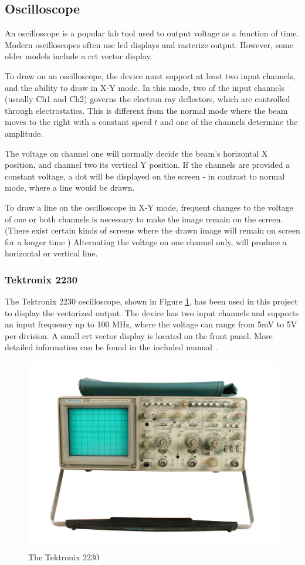 \subsection{Oscilloscope}
An oscilloscope is a popular lab tool used to output voltage as a function of time.
Modern oscilloscopes often use \gls{lcd} displays and rasterize output.
However, some older models include a \gls{crt} vector display.

To draw on an oscilloscope, the device must support at least two input channels, and the ability to draw in X-Y mode.
In this mode, two of the input channels (usually Ch1 and Ch2) governs the electron ray deflectors, which are controlled through electrostatics.
This is different from the normal mode where the beam moves to the right with a constant speed \( t \) and one of the channels determine the amplitude.

The voltage on channel one will normally decide the beam's horizontal X position, and channel two its vertical Y position.
If the channels are provided a constant voltage, a dot will be displayed on the screen - in contrast to normal mode, where a line would be drawn.

To draw a line on the oscilloscope in X-Y mode, frequent changes to the voltage of one or both channels is necessary to make the image remain on the screen.
(There exist certain kinds of screens where the drawn image will remain on screen for a longer time \cite{tektronix4010})
Alternating the voltage on one channel only, will produce a horizontal or vertical line.

\subsubsection{Tektronix 2230}
The Tektronix 2230 oscilloscope, shown in Figure \ref{fig:oscilloscope}, has been used in this project to display the vectorized output.
The device has two input channels and supports an input frequency up to 100 MHz, where the voltage can range from 5mV to 5V per division.
A small \gls{crt} vector display is located on the front panel.
More detailed information can be found in the included manual \cite{tektronix2230}.

\begin{figure}[h!]
	\centering
	\includegraphics[width=0.6\linewidth]{images/oscilloscope.jpg}
    \caption{The Tektronix 2230 \cite{oscilloscope}}
    \label{fig:oscilloscope}
\end{figure}
